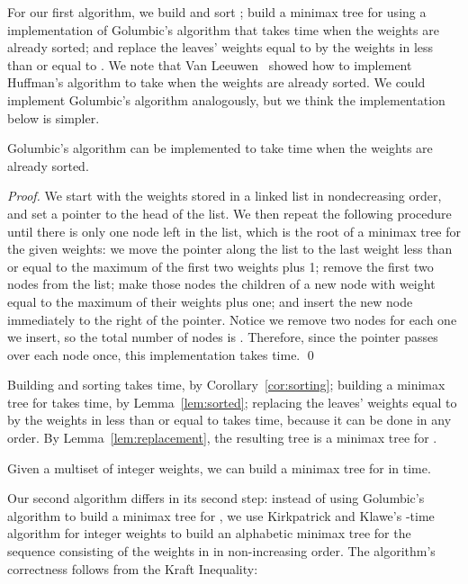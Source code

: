 \documentclass[runningheads]{llncs}
\begin{document}
For our first algorithm, we build and sort ; build a minimax tree for  using a implementation of Golumbic's algorithm that takes  time when the weights are already sorted; and replace the leaves' weights equal to  by the weights in  less than or equal to .  We note that Van Leeuwen~\cite{VLe76} showed how to implement Huffman's algorithm to take  when the weights are already sorted.  We could implement Golumbic's algorithm analogously, but we think the implementation below is simpler.

\begin{lemma} \label{lem:sorted}
Golumbic's algorithm can be implemented to take  time when the weights are already sorted.
\end{lemma}

\begin{proof}
We start with the weights stored in a linked list in nondecreasing order, and set a pointer to the head of the list.  We then repeat the following procedure until there is only one node left in the list, which is the root of a minimax tree for the given weights: we move the pointer along the list to the last weight less than or equal to the maximum of the first two weights plus 1; remove the first two nodes from the list; make those nodes the children of a new node with weight equal to the maximum of their weights plus one; and insert the new node immediately to the right of the pointer.  Notice we remove two nodes for each one we insert, so the total number of nodes is .  Therefore, since the pointer passes over each node once, this implementation takes  time.
\qed
\end{proof}

\noindent Building and sorting  takes  time, by Corollary~\ref{cor:sorting}; building a minimax tree for  takes  time, by Lemma~\ref{lem:sorted}; replacing the leaves' weights equal to  by the weights in  less than or equal to  takes  time, because it can be done in any order.  By Lemma~\ref{lem:replacement}, the resulting tree is a minimax tree for .

\begin{theorem} \label{thm:ints}
Given a multiset  of  integer weights, we can build a minimax tree for  in  time.
\end{theorem}

Our second algorithm differs in its second step: instead of using Golumbic's algorithm to build a minimax tree for , we use Kirkpatrick and Klawe's -time algorithm for integer weights to build an alphabetic minimax tree for the sequence  consisting of the weights in  in non-increasing order.  The algorithm's correctness follows from the Kraft Inequality:
\end{document}
